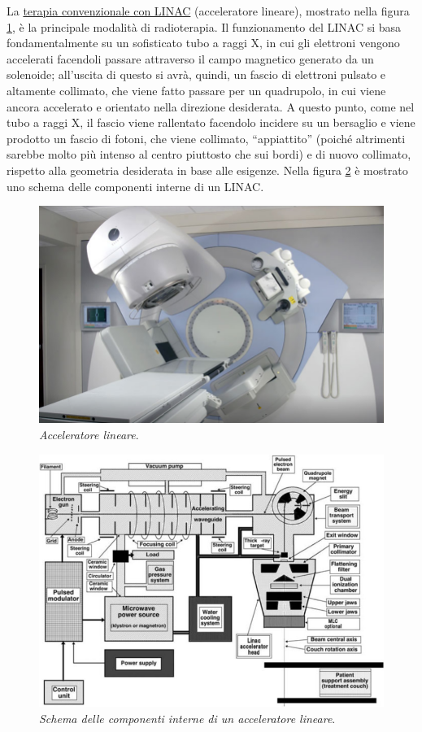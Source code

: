 \documentclass{report}
\newcommand{\virgolette}[1]{``#1''}
\newcommand{\figref}[1]{figura \ref{#1}}
\numberwithin{equation}{section}
\numberwithin{figure}{section}
\begin{document}
La \underline{terapia convenzionale con LINAC} (acceleratore lineare), mostrato nella \figref{fig:linac}, è la principale modalità di radioterapia. Il funzionamento del LINAC si basa fondamentalmente su un sofisticato tubo a raggi X, in cui gli elettroni vengono accelerati facendoli passare attraverso il campo magnetico generato da un solenoide; all'uscita di questo si avrà, quindi, un fascio di elettroni pulsato e altamente collimato, che viene fatto passare per un quadrupolo, in cui viene ancora accelerato e orientato nella direzione desiderata. A questo punto, come nel tubo a raggi X, il fascio viene rallentato facendolo incidere su un bersaglio e viene prodotto un fascio di fotoni, che viene collimato, \virgolette{appiattito} (poiché altrimenti sarebbe molto più intenso al centro piuttosto che sui bordi) e di nuovo collimato, rispetto alla geometria desiderata in base alle esigenze. Nella \figref{fig:linac2} è mostrato uno schema delle componenti interne di un LINAC.

\begin{figure}[htp]
\centering
\includegraphics[scale=0.63]{immagini/linac.png}
\caption{\label{fig:linac} \textit{Acceleratore lineare}.}
\end{figure}

\begin{figure}[H]
\centering
\includegraphics[scale=0.82]{immagini/linac2.png}
\caption{\label{fig:linac2} \textit{Schema delle componenti interne di un acceleratore lineare}.}
\end{figure}
\end{document}
